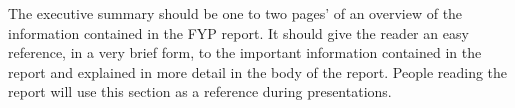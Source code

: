 The executive summary should be one to two pages’ of an overview of the information contained in the FYP report.  It should give the reader an easy reference, in a very brief form, to the important information contained in the report and explained in more detail in the body of the report. People reading the report will use this section as a reference during presentations. 
